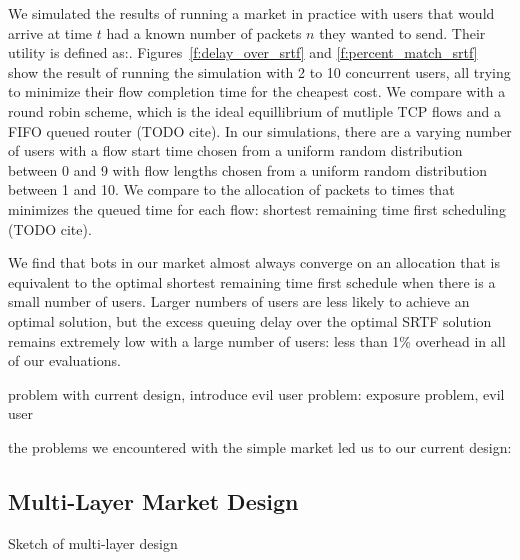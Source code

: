 We simulated the results of running a market in practice with users that would arrive at time $t$ had a known number of packets $n$ they wanted to send.
Their utility is defined as:.
Figures~\ref{f:delay_over_srtf} and \ref{f:percent_match_srtf} show the result of running the simulation with 2 to 10 concurrent users, all trying to minimize their flow completion time for the cheapest cost.
We compare with a round robin scheme, which is the ideal equillibrium of mutliple TCP flows and a FIFO queued router (TODO cite).
In our simulations, there are a varying number of users with a flow start time chosen from a uniform random distribution between 0 and 9 with flow lengths chosen from a uniform random distribution between 1 and 10. We compare to the allocation of packets to times that minimizes the queued time for each flow: shortest remaining time first scheduling (TODO cite).

We find that bots in our market almost always converge on an allocation that is equivalent to the optimal shortest remaining time first schedule when there is a small number of users. Larger numbers of users are less likely to achieve an optimal solution, but the excess queuing delay over the optimal SRTF solution remains extremely low with a large number of users: less than 1\% overhead in all of our evaluations.

problem with current design, introduce evil user
problem: exposure problem, evil user

the problems we encountered with the simple market led us to our current design:
\subsection{Multi-Layer Market Design}

Sketch of multi-layer design
